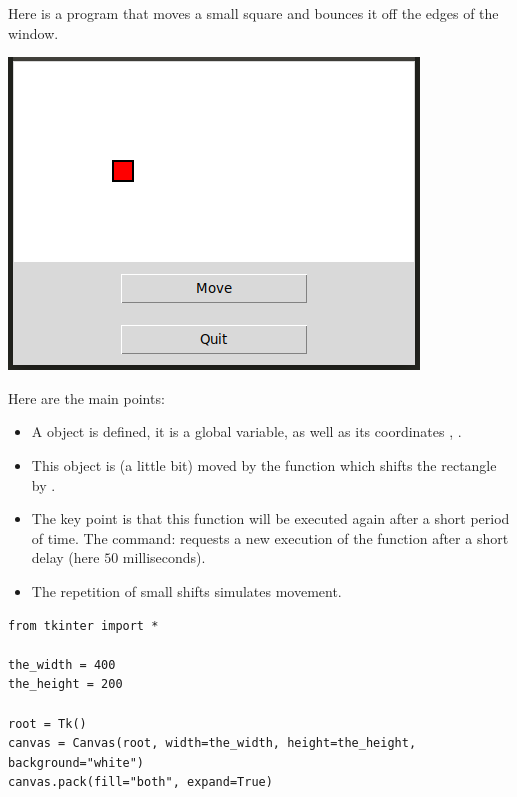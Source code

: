 \documentclass[11pt,class=report,crop=false]{standalone}
\begin{document}
\begin{cours}


Here is a program that moves a small square and bounces it off the edges of the window.

\begin{center}
\includegraphics[scale=\myscale,scale=0.5]{screen-blocks-lesson-move-en}
\end{center}

Here are the main points:
\begin{itemize}
  \item A   object is defined, it is a global variable, as well as its coordinates , .
  
  \item This object is (a little bit) moved by the  function which shifts the rectangle by .
    
  \item The key point is that this function will be executed again after a short period of time. The command: 
  requests a new execution of the  function after a short delay (here $50$ milliseconds).
  
  \item The repetition of small shifts simulates movement.
\end{itemize}

\begin{lstlisting}
from tkinter import *

the_width = 400
the_height = 200

root = Tk()     
canvas = Canvas(root, width=the_width, height=the_height, background="white")
canvas.pack(fill="both", expand=True)


\end{lstlisting}
\end{cours}
\end{document}
